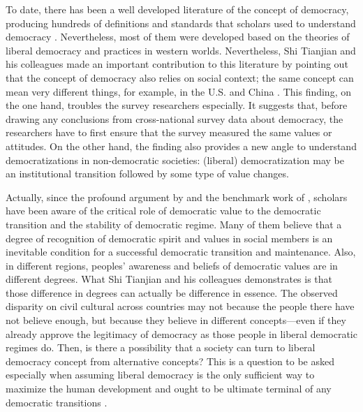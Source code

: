 \documentclass[abstracton,UTF8]{ctexart}
\begin{document}
To date, there has been a well developed literature of the concept of democracy, producing hundreds of definitions and standards that scholars used to understand democracy \citep[see, for example, ][]{Sen1999,Dahl1989,Schumpeter1947,Pateman1970,Karl1991a,Munck2014,Przeworski2000}. Nevertheless, most of them were developed based on the theories of liberal democracy and practices in western worlds. Nevertheless, Shi Tianjian and his colleagues made an important contribution to this literature by pointing out that the concept of democracy also relies on social context; the same concept can mean very different things, for example, in the U.S. and China \citep{Lu2014a,Shi2014}. This finding, on the one hand, troubles the survey researchers especially. It suggests that, before drawing any conclusions from cross-national survey data about democracy, the researchers have to first ensure that the survey measured the same values or attitudes. On the other hand, the finding also provides a new angle to understand democratizations in non-democratic societies: (liberal) democratization may be an institutional transition followed by some type of value changes.

Actually, since the profound argument by \citet{Weber1958} and the benchmark work of \citet{Almond1989}, scholars have been aware of the critical role of democratic value to the democratic transition and the stability of democratic regime. Many of them believe that a degree of recognition of democratic spirit and values in social members is an inevitable condition for a successful democratic transition and maintenance. Also, in different regions, peoples' awareness and beliefs of democratic values are in different degrees\citep[see, for example, ][]{1984,Putnam1994,PYE2006,Pye1992,Inglehart2005,Fuchs2007}. What Shi Tianjian and his colleagues demonstrates is that those difference in degrees can actually be difference in essence. The observed disparity on civil cultural across countries may not because the people there have not believe enough, but because they believe in different concepts---even if they already approve the legitimacy of democracy as those people in liberal democratic regimes do. Then, is there a possibility that a society can turn to liberal democracy concept from alternative concepts? This is a question to be asked especially when assuming liberal democracy is the only sufficient way to maximize the human development \citep{Dahl1989} and ought to be ultimate terminal of any democratic transitions \citep{Fukuyama2006}.
\end{document}
